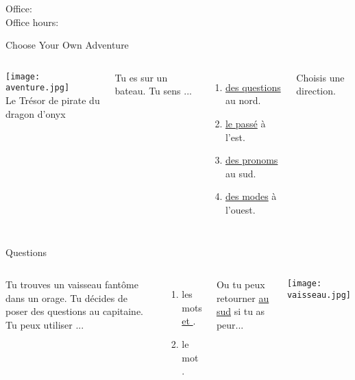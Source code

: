 \documentclass{beamer}
\subtitle[Révision, examen 1]{Révision pour l'examen 1}
\begin{document}
  \begin{frame}
    \titlepage
    \tiny{Office: \\
          Office hours: }
  \end{frame}

  \begin{frame}{Choose Your Own Adventure}
    \hypertarget{début}{}
    \begin{columns}
        \begin{center}
          \texttt{[image: aventure.jpg]} \\
          Le Trésor de pirate du dragon d'onyx
        \end{center}
        Tu es sur un bateau.
        Tu sens ...
        \begin{enumerate}
          \item \hyperlink{questions}{des questions} au nord.
          \item \hyperlink{passé}{le passé} à l'est.
          \item \hyperlink{pronoms}{des pronoms} au sud.
          \item \hyperlink{modes}{des modes} à l'ouest.
        \end{enumerate}
        Choisis une direction.
    \end{columns}
  \end{frame}

  \begin{frame}{Questions}
    \hypertarget{questions}{}
    \begin{columns}
        Tu trouves un vaisseau fantôme dans un orage.
        Tu décides de poser des questions au capitaine.
        Tu peux utiliser ...
        \begin{enumerate}
          \item les mots \hyperlink{que}{ et }.
          \item le mot \hyperlink{quel}{}.
        \end{enumerate}
        Ou tu peux retourner \hyperlink{début}{au sud} si tu as peur...
        \begin{center}
          \texttt{[image: vaisseau.jpg]}
        \end{center}
    \end{columns}
  \end{frame}
\end{document}
